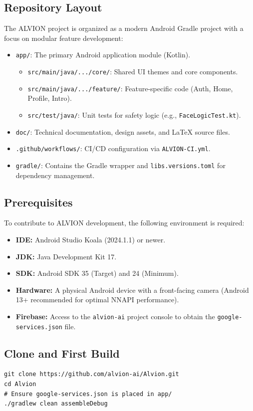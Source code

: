 \documentclass[11pt]{report}
\begin{document}
\subsection{Repository Layout}
The ALVION project is organized as a modern Android Gradle project with a focus on modular feature development:
\begin{itemize}
    \item \texttt{app/}: The primary Android application module (Kotlin).
    \begin{itemize}
        \item \texttt{src/main/java/.../core/}: Shared UI themes and core components.
        \item \texttt{src/main/java/.../feature/}: Feature-specific code (Auth, Home, Profile, Intro).
        \item \texttt{src/test/java/}: Unit tests for safety logic (e.g., \texttt{FaceLogicTest.kt}).
    \end{itemize}
    \item \texttt{doc/}: Technical documentation, design assets, and LaTeX source files.
    \item \texttt{.github/workflows/}: CI/CD configuration via \texttt{ALVION-CI.yml}.
    \item \texttt{gradle/}: Contains the Gradle wrapper and \texttt{libs.versions.toml} for dependency management.
\end{itemize}

\subsection{Prerequisites}
To contribute to ALVION development, the following environment is required:
\begin{itemize}
    \item \textbf{IDE:} Android Studio Koala (2024.1.1) or newer.
    \item \textbf{JDK:} Java Development Kit 17.
    \item \textbf{SDK:} Android SDK 35 (Target) and 24 (Minimum).
    \item \textbf{Hardware:} A physical Android device with a front-facing camera (Android 13+ recommended for optimal NNAPI performance).
    \item \textbf{Firebase:} Access to the \texttt{alvion-ai} project console to obtain the \texttt{google-services.json} file.
\end{itemize}

\subsection{Clone and First Build}
\begin{verbatim}
git clone https://github.com/alvion-ai/Alvion.git
cd Alvion
# Ensure google-services.json is placed in app/
./gradlew clean assembleDebug
\end{verbatim}
\end{document}
